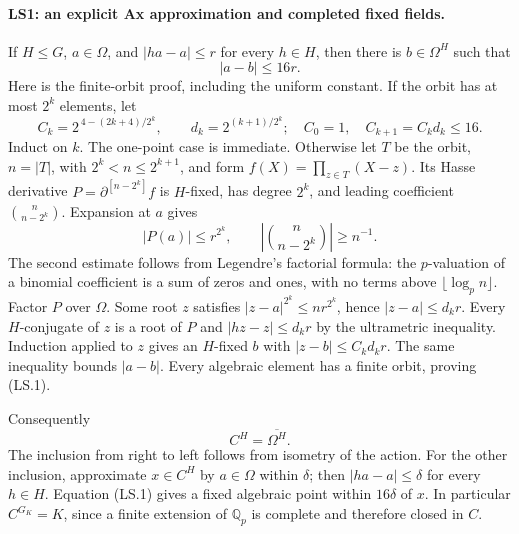 \paragraph{LS1: an explicit Ax approximation and completed fixed fields.}
If $H\le G$, $a\in\Omega$, and $|ha-a|\le r$ for every $h\in H$,
then there is $b\in\Omega^H$ such that
\[
                     |a-b|\le16r.                 \tag{LS.1}
\]
Here is the finite-orbit proof, including the uniform constant. If the
orbit has at most $2^k$ elements, let
\[
 C_k=2^{\,4-(2k+4)/2^k},\qquad
 d_k=2^{(k+1)/2^k};\quad C_0=1,\quad C_{k+1}=C_kd_k\le16.
 \tag{LS.2}
\]
Induct on $k$. The one-point case is immediate. Otherwise let $T$ be
the orbit, $n=|T|$, with $2^k<n\le2^{k+1}$, and form
$f(X)=\prod_{z\in T}(X-z)$. Its Hasse derivative
$P=\partial^{[n-2^k]}f$ is $H$-fixed, has degree $2^k$, and leading
coefficient $\binom n{n-2^k}$. Expansion at $a$ gives
\[
 |P(a)|\le r^{2^k},\qquad
 \left|\binom n{n-2^k}\right|\ge n^{-1}.          \tag{LS.3}
\]
The second estimate follows from Legendre's factorial formula: the
$p$-valuation of a binomial coefficient is a sum of zeros and ones,
with no terms above $\lfloor\log_p n\rfloor$.
Factor $P$ over $\Omega$. Some root $z$ satisfies
$|z-a|^{2^k}\le n r^{2^k}$, hence $|z-a|\le d_kr$.
Every $H$-conjugate of $z$ is a root of $P$ and
$|hz-z|\le d_kr$ by the ultrametric inequality. Induction applied to
$z$ gives an $H$-fixed $b$ with
$|z-b|\le C_kd_kr$. The same inequality bounds $|a-b|$.
Every algebraic element has a finite orbit, proving (LS.1).

Consequently
\[
                         C^H=\overline{\Omega^H}.   \tag{LS.4}
\]
The inclusion from right to left follows from isometry of the action.
For the other inclusion, approximate $x\in C^H$ by $a\in\Omega$
within $\delta$; then $|ha-a|\le\delta$ for every $h\in H$.
Equation (LS.1) gives a fixed algebraic point within $16\delta$ of
$x$. In particular $C^{G_K}=K$, since a finite extension of
$\mathbb Q_p$ is complete and therefore closed in $C$.

